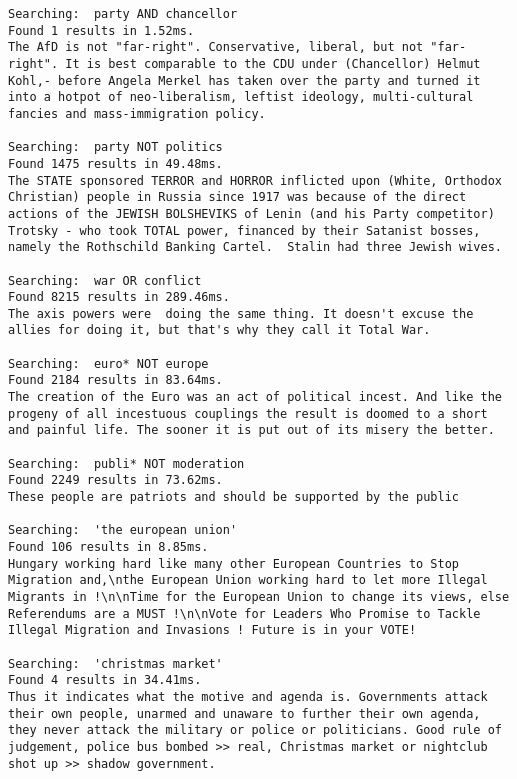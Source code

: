 \documentclass{scrartcl}
\begin{document}
\begin{lstlisting}
Searching:  party AND chancellor
Found 1 results in 1.52ms.
The AfD is not "far-right". Conservative, liberal, but not "far-right". It is best comparable to the CDU under (Chancellor) Helmut Kohl,- before Angela Merkel has taken over the party and turned it into a hotpot of neo-liberalism, leftist ideology, multi-cultural fancies and mass-immigration policy.

Searching:  party NOT politics
Found 1475 results in 49.48ms.
The STATE sponsored TERROR and HORROR inflicted upon (White, Orthodox Christian) people in Russia since 1917 was because of the direct actions of the JEWISH BOLSHEVIKS of Lenin (and his Party competitor) Trotsky - who took TOTAL power, financed by their Satanist bosses, namely the Rothschild Banking Cartel.  Stalin had three Jewish wives.

Searching:  war OR conflict
Found 8215 results in 289.46ms.
The axis powers were  doing the same thing. It doesn't excuse the allies for doing it, but that's why they call it Total War.

Searching:  euro* NOT europe
Found 2184 results in 83.64ms.
The creation of the Euro was an act of political incest. And like the progeny of all incestuous couplings the result is doomed to a short and painful life. The sooner it is put out of its misery the better.

Searching:  publi* NOT moderation
Found 2249 results in 73.62ms.
These people are patriots and should be supported by the public

Searching:  'the european union'
Found 106 results in 8.85ms.
Hungary working hard like many other European Countries to Stop Migration and,\nthe European Union working hard to let more Illegal Migrants in !\n\nTime for the European Union to change its views, else Referendums are a MUST !\n\nVote for Leaders Who Promise to Tackle Illegal Migration and Invasions ! Future is in your VOTE!

Searching:  'christmas market'
Found 4 results in 34.41ms.
Thus it indicates what the motive and agenda is. Governments attack their own people, unarmed and unaware to further their own agenda, they never attack the military or police or politicians. Good rule of judgement, police bus bombed >> real, Christmas market or nightclub shot up >> shadow government.

\end{lstlisting}
\end{document}
